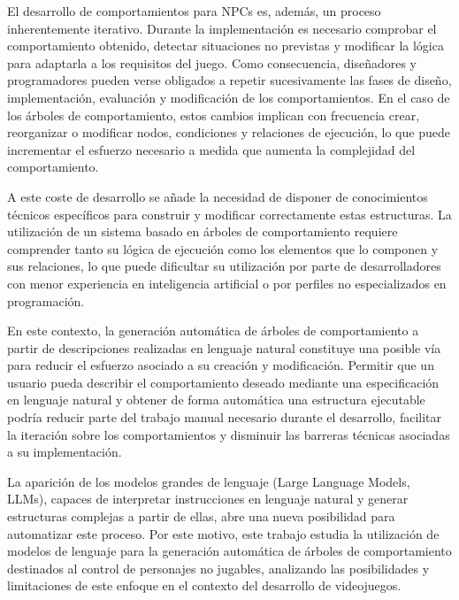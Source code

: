 El desarrollo de comportamientos para NPCs es, además, un proceso inherentemente iterativo.
Durante la implementación es necesario comprobar el comportamiento obtenido, detectar situaciones no previstas y modificar la lógica para adaptarla a los requisitos del juego.
Como consecuencia, diseñadores y programadores pueden verse obligados a repetir sucesivamente las fases de diseño, implementación, evaluación y modificación de los comportamientos.
En el caso de los árboles de comportamiento, estos cambios implican con frecuencia crear, reorganizar o modificar nodos, condiciones y relaciones de ejecución, lo que puede incrementar el esfuerzo necesario a medida que aumenta la complejidad del comportamiento.

A este coste de desarrollo se añade la necesidad de disponer de conocimientos técnicos específicos para construir y modificar correctamente estas estructuras.
La utilización de un sistema basado en árboles de comportamiento requiere comprender tanto su lógica de ejecución como los elementos que lo componen y sus relaciones, lo que puede dificultar su utilización por parte de desarrolladores con menor experiencia en inteligencia artificial o por perfiles no especializados en programación.

En este contexto, la generación automática de árboles de comportamiento a partir de descripciones realizadas en lenguaje natural constituye una posible vía para reducir el esfuerzo asociado a su creación y modificación.
Permitir que un usuario pueda describir el comportamiento deseado mediante una especificación en lenguaje natural y obtener de forma automática una estructura ejecutable podría reducir parte del trabajo manual necesario durante el desarrollo, facilitar la iteración sobre los comportamientos y disminuir las barreras técnicas asociadas a su implementación.

La aparición de los modelos grandes de lenguaje (Large Language Models, LLMs), capaces de interpretar instrucciones en lenguaje natural y generar estructuras complejas a partir de ellas, abre una nueva posibilidad para automatizar este proceso.
Por este motivo, este trabajo estudia la utilización de modelos de lenguaje para la generación automática de árboles de comportamiento destinados al control de personajes no jugables, analizando las posibilidades y limitaciones de este enfoque en el contexto del desarrollo de videojuegos.

